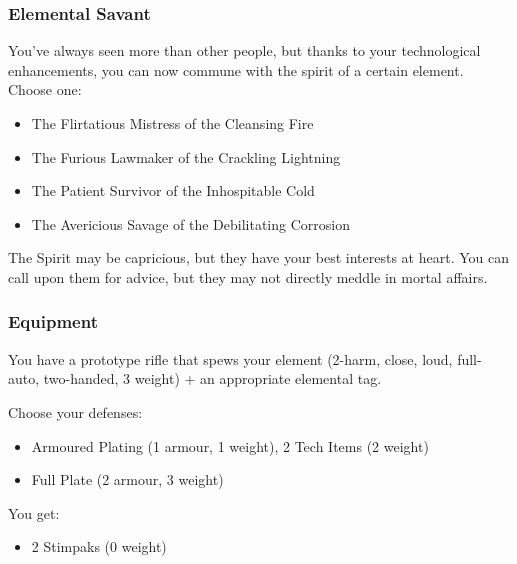 \subsubsection{Elemental Savant}
You've always seen more than other people, but thanks to your technological enhancements, you can now commune with the spirit of a certain element. Choose one:
\begin{itemize}
\item The Flirtatious Mistress of the Cleansing Fire
\item The Furious Lawmaker of the Crackling Lightning
\item The Patient Survivor of the Inhospitable Cold
\item The Avericious Savage of the Debilitating Corrosion
\end{itemize}
The Spirit may be capricious, but they have your best interests at heart. You can call upon them for advice, but they may not directly meddle in mortal affairs.



\subsubsection{Equipment}
You have a prototype rifle that spews your element (2-harm, close, loud, full-auto, two-handed, 3 weight) + an appropriate elemental tag.

Choose your defenses:
\begin{itemize}
\item Armoured Plating (1 armour, 1 weight), 2 Tech Items (2 weight)
\item Full Plate (2 armour, 3 weight)
\end{itemize}

You get:
\begin{itemize}
\item 2 Stimpaks (0 weight)
\end{itemize}

